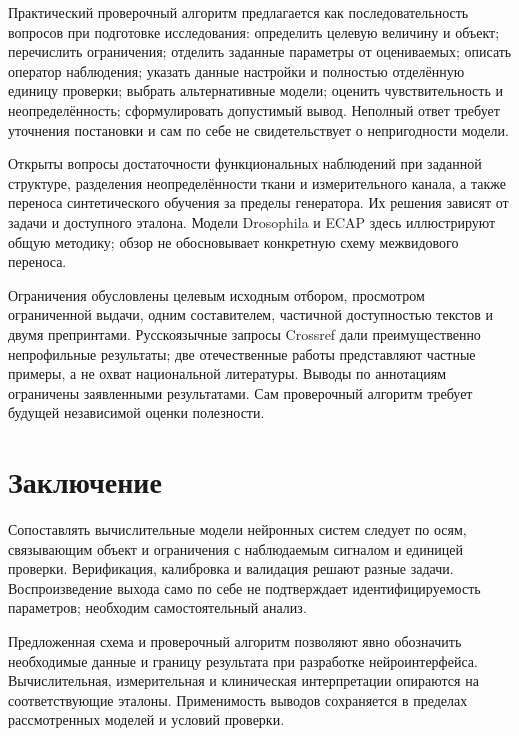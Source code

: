 \documentclass[12pt,a4paper]{article}
\begin{document}
Практический проверочный алгоритм предлагается как последовательность вопросов при подготовке исследования: определить целевую величину и объект; перечислить ограничения; отделить заданные параметры от оцениваемых; описать оператор наблюдения; указать данные настройки и полностью отделённую единицу проверки; выбрать альтернативные модели; оценить чувствительность и неопределённость; сформулировать допустимый вывод. Неполный ответ требует уточнения постановки и сам по себе не свидетельствует о непригодности модели.\par
Открыты вопросы достаточности функциональных наблюдений при заданной структуре, разделения неопределённости ткани и измерительного канала, а также переноса синтетического обучения за пределы генератора. Их решения зависят от задачи и доступного эталона. Модели Drosophila и ECAP здесь иллюстрируют общую методику; обзор не обосновывает конкретную схему межвидового переноса.\par
Ограничения обусловлены целевым исходным отбором, просмотром ограниченной выдачи, одним составителем, частичной доступностью текстов и двумя препринтами. Русскоязычные запросы Crossref дали преимущественно непрофильные результаты; две отечественные работы представляют частные примеры, а не охват национальной литературы. Выводы по аннотациям ограничены заявленными результатами. Сам проверочный алгоритм требует будущей независимой оценки полезности.\par
\section*{Заключение}
Сопоставлять вычислительные модели нейронных систем следует по осям, связывающим объект и ограничения с наблюдаемым сигналом и единицей проверки. Верификация, калибровка и валидация решают разные задачи. Воспроизведение выхода само по себе не подтверждает идентифицируемость параметров; необходим самостоятельный анализ.\par
Предложенная схема и проверочный алгоритм позволяют явно обозначить необходимые данные и границу результата при разработке нейроинтерфейса. Вычислительная, измерительная и клиническая интерпретации опираются на соответствующие эталоны. Применимость выводов сохраняется в пределах рассмотренных моделей и условий проверки.\par
\end{document}

